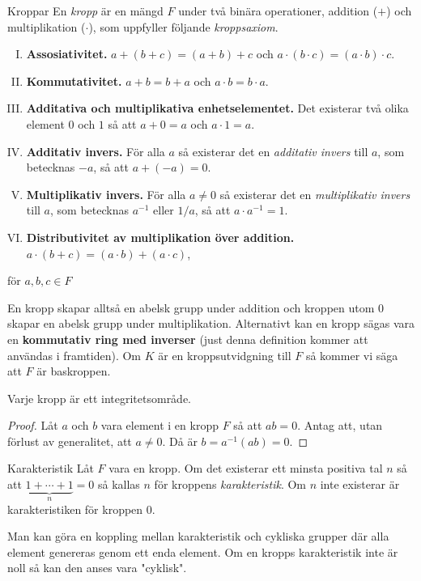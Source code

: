 \documentclass{article}
\theoremstyle{definition}
\begin{document}
\begin{mydef}{Kroppar}{}
    En \textit{kropp} är en mängd $F$ under två binära operationer, addition ($+$) och multiplikation ($\cdot$), som uppfyller följande \textit{kroppsaxiom}.
    \begin{enumerate}[I)]
        \item \textbf{Assosiativitet.} $a + (b + c) = (a + b) + c$ och $a \cdot (b \cdot c) = (a \cdot b) \cdot c$.
        \item \textbf{Kommutativitet.} $a + b = b + a$ och $a \cdot b = b \cdot a$.
        \item \textbf{Additativa och multiplikativa enhetselementet.} Det existerar två olika element $0$ och $1$ så att $a + 0 = a$ och $a \cdot 1 = a.$
        \item \textbf{Additativ invers.} För alla $a$ så existerar det en \textit{additativ invers} till $a$, som betecknas
        $-a$, så att $a + (-a) = 0$.
        \item \textbf{Multiplikativ invers.} För alla $a \neq 0$ så existerar det en \textit{multiplikativ invers} till $a$, som betecknas $a^{-1}$ eller $1/a$, så att 
        $a \cdot a^{-1} = 1.$
        \item \textbf{Distributivitet av multiplikation över addition.} $a \cdot (b + c) = (a \cdot b) + (a \cdot c)$,
    \end{enumerate}
    för $a, b, c \in F$
\end{mydef}
En kropp skapar alltså en abelsk grupp under addition och kroppen utom $0$ skapar en abelsk grupp under multiplikation. Alternativt kan en kropp sägas
vara en \textbf{kommutativ ring med inverser} (just denna definition kommer att användas i framtiden). 
Om $K$ är en kroppsutvidgning till $F$ så kommer vi säga att $F$ är baskroppen. 

\begin{myprop}{}{}
  Varje kropp är ett integritetsområde.
\end{myprop}

\begin{proof}
  Låt $a$ och $b$ vara element i en kropp $F$ så att $ab = 0$. Antag att, utan förlust av generalitet, att $a \neq 0.$ 
  Då är $b = a^{-1}(ab) = 0$. 
\end{proof}

\begin{mydef}{Karakteristik}{}
  Låt $F$ vara en kropp. Om det existerar ett minsta positiva tal $n$ så att $\underbrace{1 + \cdots + 1}_{n} = 0$ så kallas $n$ för kroppens \textit{karakteristik}.
  Om $n$ inte existerar är karakteristiken för kroppen $0.$
\end{mydef}
Man kan göra en koppling mellan karakteristik och cykliska grupper där alla element genereras genom ett enda element. Om en kropps karakteristik inte är noll
så kan den anses vara "cyklisk". 
\end{document}
